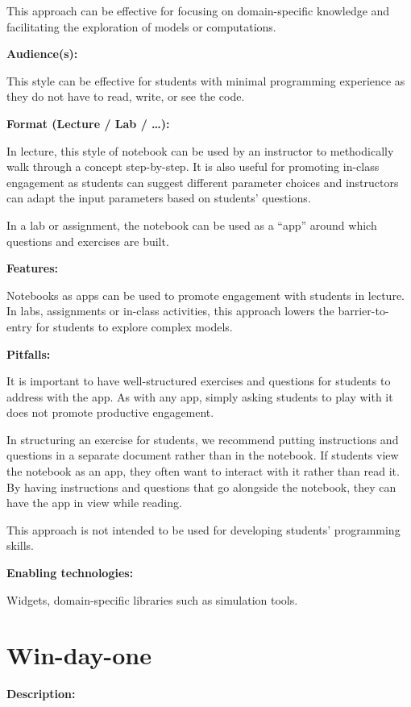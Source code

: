 \documentclass[]{book}
\begin{document}
This approach can be effective for focusing on domain-specific knowledge
and facilitating the exploration of models or computations.

\textbf{Audience(s):}

This style can be effective for students with minimal programming
experience as they do not have to read, write, or see the code.

\textbf{Format (Lecture / Lab / \ldots{}):}

In lecture, this style of notebook can be used by an instructor to
methodically walk through a concept step-by-step. It is also useful for
promoting in-class engagement as students can suggest different
parameter choices and instructors can adapt the input parameters based
on students' questions.

In a lab or assignment, the notebook can be used as a ``app'' around
which questions and exercises are built.

\textbf{Features:}

Notebooks as apps can be used to promote engagement with students in
lecture. In labs, assignments or in-class activities, this approach
lowers the barrier-to-entry for students to explore complex models.

\textbf{Pitfalls:}

It is important to have well-structured exercises and questions for
students to address with the app. As with any app, simply asking
students to play with it does not promote productive engagement.

In structuring an exercise for students, we recommend putting
instructions and questions in a separate document rather than in the
notebook. If students view the notebook as an app, they often want to
interact with it rather than read it. By having instructions and
questions that go alongside the notebook, they can have the app in view
while reading.

This approach is not intended to be used for developing students'
programming skills.

\textbf{Enabling technologies:}

Widgets, domain-specific libraries such as simulation tools.

\hypertarget{win-day-one}{\section{Win-day-one}\label{win-day-one}}

\textbf{Description:}
\end{document}
